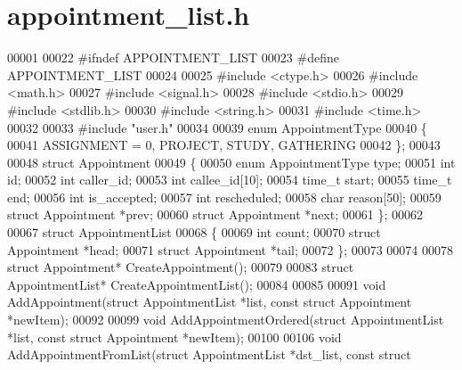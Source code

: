 \section{appointment\+\_\+list.\+h}
\label{appointment__list_8h_source}

\begin{DoxyCode}
00001 
00022 \textcolor{preprocessor}{#ifndef APPOINTMENT\_LIST}
00023 \textcolor{preprocessor}{#define APPOINTMENT\_LIST}
00024 
00025 \textcolor{preprocessor}{#include <ctype.h>}
00026 \textcolor{preprocessor}{#include <math.h>}
00027 \textcolor{preprocessor}{#include <signal.h>}
00028 \textcolor{preprocessor}{#include <stdio.h>}
00029 \textcolor{preprocessor}{#include <stdlib.h>}
00030 \textcolor{preprocessor}{#include <string.h>}
00031 \textcolor{preprocessor}{#include <time.h>}
00032 
00033 \textcolor{preprocessor}{#include "user.h"}
00034 
00039 \textcolor{keyword}{enum} AppointmentType
00040 \{
00041     ASSIGNMENT = 0, PROJECT, STUDY, GATHERING
00042 \};
00043 
00048 \textcolor{keyword}{struct }Appointment
00049 \{
00050     \textcolor{keyword}{enum} AppointmentType type;
00051     \textcolor{keywordtype}{int} id;
00052     \textcolor{keywordtype}{int} caller\_id;
00053     \textcolor{keywordtype}{int} callee\_id[10];
00054     time\_t start;
00055     time\_t end;
00056     \textcolor{keywordtype}{int} is\_accepted;
00057     \textcolor{keywordtype}{int} rescheduled;
00058     \textcolor{keywordtype}{char} reason[50];
00059     \textcolor{keyword}{struct }Appointment *prev;
00060     \textcolor{keyword}{struct }Appointment *next;
00061 \};
00062 
00067 \textcolor{keyword}{struct }AppointmentList
00068 \{
00069     \textcolor{keywordtype}{int} count;
00070     \textcolor{keyword}{struct }Appointment *head;
00071     \textcolor{keyword}{struct }Appointment *tail;
00072 \};
00073 
00074 
00078 \textcolor{keyword}{struct }Appointment* CreateAppointment();
00079 
00083 \textcolor{keyword}{struct }AppointmentList* CreateAppointmentList();
00084 
00085 
00091 \textcolor{keywordtype}{void} AddAppointment(\textcolor{keyword}{struct} AppointmentList *list, \textcolor{keyword}{const} \textcolor{keyword}{struct} Appointment *newItem);
00092 
00099 \textcolor{keywordtype}{void} AddAppointmentOrdered(\textcolor{keyword}{struct} AppointmentList *list, \textcolor{keyword}{const} \textcolor{keyword}{struct} 
      Appointment *newItem);
00100 
00106 \textcolor{keywordtype}{void} AddAppointmentFromList(\textcolor{keyword}{struct} AppointmentList *dst\_list, \textcolor{keyword}{const} \textcolor{keyword}{struct} 

\end{DoxyCode}
